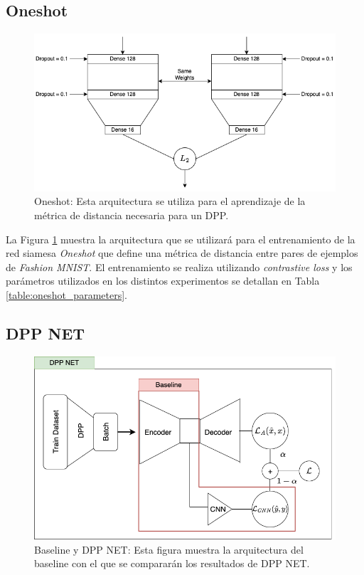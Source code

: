 \subsection{Oneshot}

\begin{figure}[ht]
    \centering
    \includegraphics[width=14cm]{img/tesis/oneshot_arquitectura.png}
    \caption{Oneshot: Esta arquitectura se utiliza para el aprendizaje de la métrica de distancia necesaria para un DPP.}
    \label{fig:oneshot_arquitectura}
\end{figure}

La Figura \ref{fig:oneshot_arquitectura} muestra la arquitectura que se utilizará para el entrenamiento de la red siamesa \textit{Oneshot} que define una métrica de distancia entre pares de ejemplos de \textit{Fashion MNIST}. El entrenamiento se realiza utilizando \textit{contrastive loss} y los parámetros utilizados en los distintos experimentos se detallan en Tabla \ref{table:oneshot_parameters}.

\subsection{DPP NET}

\begin{figure}[h]
    \centering
    \includegraphics[width=12cm]{img/tesis/baseline_dppnet.png}
    \caption{Baseline y DPP NET: Esta figura muestra la arquitectura del baseline con el que se compararán los resultados de DPP NET.}
    \label{fig:baseline_dpp_net}
\end{figure}

